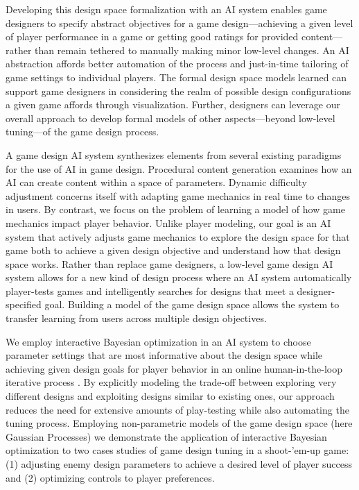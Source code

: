 \documentclass[letterpaper]{article}
\begin{document}
Developing this design space formalization with an AI system enables game designers to specify abstract objectives for a game design---achieving a given level of player performance in a game or getting good ratings for provided content---rather than remain tethered to manually making minor low-level changes.
An AI abstraction affords better automation of the process and just-in-time tailoring of game settings to individual players.
The formal design space models learned can support game designers in considering the realm of possible design configurations a given game affords through visualization.
Further, designers can leverage our overall approach to develop formal models of other aspects---beyond low-level tuning---of the game design process.

A game design AI system synthesizes elements from several existing paradigms for the use of AI in game design. Procedural content generation examines how an AI can create content within a space of parameters.  Dynamic difficulty adjustment concerns itself with adapting game mechanics in real time to changes in users. By contrast, we focus on the problem of learning a model of how game mechanics impact player behavior. Unlike player modeling, our goal is an AI system that actively adjusts game mechanics to explore the design space for that game both to achieve a given design objective and understand how that design space works. Rather than replace game designers, a low-level game design AI system allows for a new kind of design process where an AI system automatically player-tests games and intelligently searches for designs that meet a designer-specified goal. Building a model of the game design space allows the system to transfer learning from users across multiple design objectives.


We employ interactive Bayesian optimization in an AI system to choose parameter settings that are most informative about the design space while achieving given design goals for player behavior in an online human-in-the-loop iterative process \cite{brochu2010:thesis}. By explicitly modeling the trade-off between exploring very different designs and exploiting designs similar to existing ones, our approach reduces the need for extensive amounts of play-testing while also automating the tuning process.
Employing non-parametric models of the game design space (here Gaussian Processes) we demonstrate the application of interactive Bayesian optimization to two cases studies of game design tuning in a shoot-'em-up game: (1) adjusting enemy design parameters to achieve a desired level of player success and (2) optimizing controls to player preferences.
\end{document}
